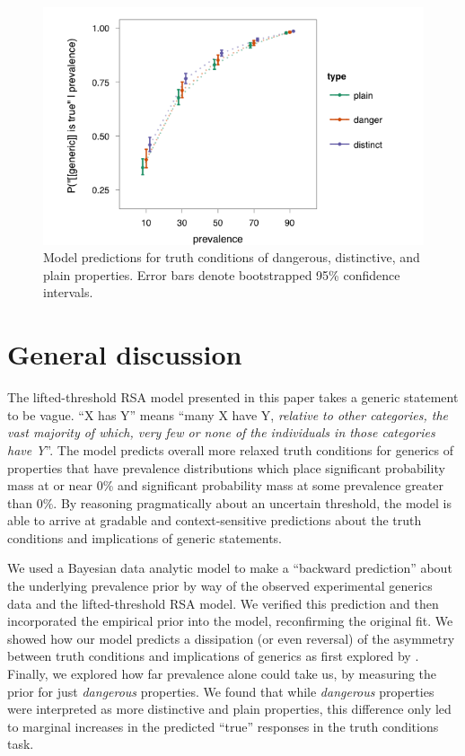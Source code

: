 \documentclass[10pt,letterpaper]{article}
\begin{document}
\begin{figure}
\centering
    \includegraphics[width=0.8\columnwidth]{ddb_bootstrap_truthconds}
    \caption{Model predictions for truth conditions of dangerous, distinctive, and plain properties. Error bars denote bootstrapped 95\% confidence intervals.}
  \label{fig:tcddb}
\end{figure}


\section{General discussion}

The lifted-threshold RSA model presented in this paper takes a generic statement to be vague. ``X has Y'' means ``many X have Y, \emph{relative to other categories, the vast majority of which, very few or none of the individuals in those categories have Y}''. The model predicts overall more relaxed truth conditions for generics of properties that have prevalence distributions which place significant probability mass at or near 0\% and significant probability mass at some prevalence greater than 0\%. By reasoning pragmatically about an uncertain threshold, the model is able to arrive at gradable and context-sensitive predictions about the truth conditions and implications of generic statements. 

We used a Bayesian data analytic model to make a ``backward prediction'' about the underlying prevalence prior by way of the observed experimental generics data and the lifted-threshold RSA model. We verified this prediction and then incorporated the empirical prior into the model, reconfirming the original fit. We showed how our model predicts a dissipation (or even reversal) of the asymmetry between truth conditions and implications of generics as first explored by . Finally, we explored how far prevalence alone could take us, by measuring the prior for just \emph{dangerous} properties. We found that while \emph{dangerous} properties were interpreted as more distinctive and plain properties, this difference only led to marginal increases in the predicted ``true'' responses in the truth conditions task. 
\end{document}
